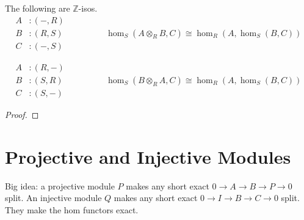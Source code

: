 \documentclass[twoside,10pt]{report}
\begin{document}
\begin{thrm}
	The following are $\mathbb{Z}$-isos.
\begin{equation*}
	\begin{aligned}
		A&:(-,R)\\
		B&:(R,S)\\
		C&:(-,S)
	\end{aligned}
	\qquad\qquad
	\begin{aligned}
		\hom_S(A\otimes_{R}B,C) \cong \hom_R(A,\hom_S(B,C))
	\end{aligned}
\end{equation*}

\vspace{5mm}

\begin{equation*}
	\begin{aligned}
		A&:(R,-)\\
		B&:(S,R)\\
		C&:(S,-)
	\end{aligned}
	\qquad\qquad
	\begin{aligned}
		\hom_S(B\otimes_{R}A,C) \cong \hom_R(A,\hom_S(B,C))
	\end{aligned}
\end{equation*}
\end{thrm}
\begin{proof}
\end{proof}

\section{Projective and Injective Modules}


\begin{note}[]
	Big idea: a projective module $P$ makes any short exact $0\to A \to B \to P \to 0$ split. An injective module $Q$ makes any short exact $0 \to I\to B\to C\to 0$ split. They make the hom functors exact.
\end{note}
\end{document}
